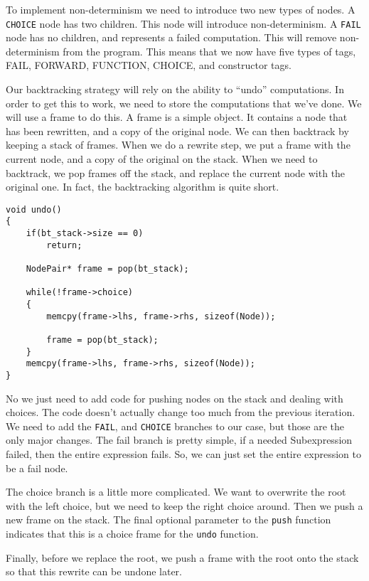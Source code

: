 \documentclass{article}
\begin{document}
To implement non-determinism we need to introduce two new types of nodes.
A \texttt{CHOICE} node has two children.  This node will introduce non-determinism.
A \texttt{FAIL} node has no children, and represents a failed computation.
This will remove non-determinism from the program.
This means that we now have five types of tags, FAIL, FORWARD, FUNCTION, CHOICE, and constructor tags.

Our backtracking strategy will rely on the ability to ``undo'' computations.
In order to get this to work, we need to store the computations that we've done.
We will use a frame to do this.
A frame is a simple object.
It contains a node that has been rewritten, and a copy of the original node.
We can then backtrack by keeping a stack of frames.
When we do a rewrite step, we put a frame with the current node, and a copy of the original on the stack.
When we need to backtrack, we pop frames off the stack, and replace the current node with the original one.
In fact, the backtracking algorithm is quite short.

\begin{verbatim}
void undo()
{
    if(bt_stack->size == 0)
        return;

    NodePair* frame = pop(bt_stack);

    while(!frame->choice)
    {
        memcpy(frame->lhs, frame->rhs, sizeof(Node));

        frame = pop(bt_stack);
    }
    memcpy(frame->lhs, frame->rhs, sizeof(Node));
}
\end{verbatim}

No we just need to add code for pushing nodes on the stack
and dealing with choices.
The code doesn't actually change too much from the previous iteration.
We need to add the \texttt{FAIL}, and \texttt{CHOICE} branches to our case,
but those are the only major changes.
The fail branch is pretty simple, if a needed Subexpression failed, then the entire expression fails.
So, we can just set the entire expression to be a fail node.

The choice branch is a little more complicated.
We want to overwrite the root with the left choice,
but we need to keep the right choice around.
Then we push a new frame on the stack.
The final optional parameter to the \texttt{push} function
indicates that this is a choice frame for the \texttt{undo} function.

Finally, before we replace the root, we push a frame with the root onto the stack
so that this rewrite can be undone later.
\end{document}
